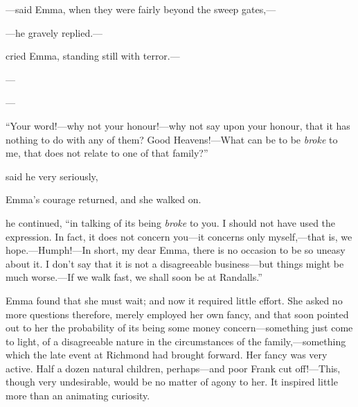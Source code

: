 ---said Emma, when they were fairly beyond the sweep gates,---

---he gravely replied.---

 cried Emma, standing still with terror.---

---


---

“Your word!---why not your honour!---why not say upon your honour, that it has nothing to do with any of them? Good Heavens!---What can be to be {\em broke} to me, that does not relate to one of that family?”

 said he very seriously, 

Emma's courage returned, and she walked on.

 he continued, “in talking of its being {\em broke} to you. I should not have used the expression. In fact, it does not concern you---it concerns only myself,---that is, we hope.---Humph!---In short, my dear Emma, there is no occasion to be so uneasy about it. I don't say that it is not a disagreeable business---but things might be much worse.---If we walk fast, we shall soon be at Randalls.”

Emma found that she must wait; and now it required little effort. She asked no more questions therefore, merely employed her own fancy, and that soon pointed out to her the probability of its being some money concern---something just come to light, of a disagreeable nature in the circumstances of the family,---something which the late event at Richmond had brought forward. Her fancy was very active. Half a dozen natural children, perhaps---and poor Frank cut off!---This, though very undesirable, would be no matter of agony to her. It inspired little more than an animating curiosity.


